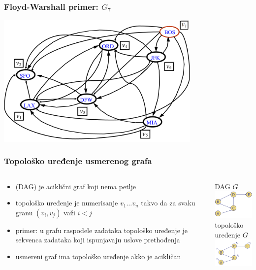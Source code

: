 \documentclass[compress,aspectratio=169]{beamer}
\begin{document}
\begin{frame}[fragile]
  \frametitle{Floyd-Warshall primer: $G_7$}
  \begin{center}
    \includegraphics[width=10cm]{asp-14-pic44.png}
  \end{center}
\end{frame}

\begin{frame}[fragile]
  \frametitle{Topološko uređenje usmerenog grafa}
  \begin{columns}
    \begin{column}[t]{6cm}
      \begin{itemize}
        \item {} (DAG) je aciklični graf 
          koji nema petlje
        \item topološko uređenje je numerisanje $v_{1} \ldots v_{n}$
          takvo da za svaku granu $(v_{i},v_{j})$ važi $i<j$
        \item primer: u grafu raspodele zadataka topološko uređenje je
          sekvenca zadataka koji ispunjavaju uslove prethođenja
        \item usmereni graf ima topološko uređenje akko je acikličan
      \end{itemize}
    \end{column}
    \begin{column}[t]{6cm}
      \begin{center}
        \hfill DAG $G$ \\
        \includegraphics[width=3cm]{asp-14-pic45.png} \\ 
        \hfill topološko uređenje $G$ \\
        \includegraphics[width=3.5cm]{asp-14-pic46.png}
      \end{center}
    \end{column}
  \end{columns}
\end{frame}
\end{document}
